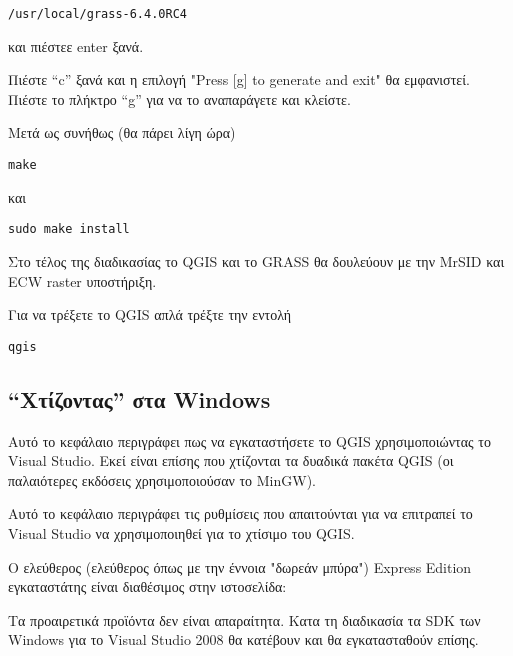 \begin{verbatim}
/usr/local/grass-6.4.0RC4
\end{verbatim}

και πιέστεε enter ξανά.

Πιέστε “c” ξανά και η επιλογή "Press [g] to generate and exit" θα εμφανιστεί.
Πιέστε το πλήκτρο “g” για να το αναπαράγετε και κλείστε.

Μετά ως συνήθως (θα πάρει λίγη ώρα) 

\begin{verbatim}
make
\end{verbatim}

και

\begin{verbatim}
sudo make install
\end{verbatim}

Στο τέλος της διαδικασίας το QGIS και το GRASS θα δουλεύουν με την MrSID και ECW raster υποστήριξη. 

Για να τρέξετε το QGIS απλά τρέξτε την εντολή

\begin{verbatim}
qgis
\end{verbatim}


\hypertarget{toc14}{}
\subsection{“Χτίζοντας” στα Windows}
\hypertarget{toc15}{}
Αυτό το κεφάλαιο περιγράφει πως να εγκαταστήσετε το QGIS χρησιμοποιώντας το Visual Studio. Εκεί είναι επίσης που χτίζονται τα δυαδικά πακέτα QGIS (οι παλαιότερες εκδόσεις χρησιμοποιούσαν το MinGW).

Αυτό το κεφάλαιο περιγράφει τις ρυθμίσεις που απαιτούνται για να επιτραπεί το Visual Studio να χρησιμοποιηθεί για το χτίσιμο του QGIS.  

Ο ελεύθερος (ελεύθερος όπως με την έννοια "δωρεάν μπύρα") Express Edition εγκαταστάτης είναι διαθέσιμος στην ιστοσελίδα:

	\begin{quotation}
	\end{quotation}

Tα προαιρετικά προϊόντα δεν είναι απαραίτητα. Κατα τη διαδικασία τα SDK των Windows για το Visual Studio 2008 θα κατέβουν και θα εγκατασταθούν επίσης. 

